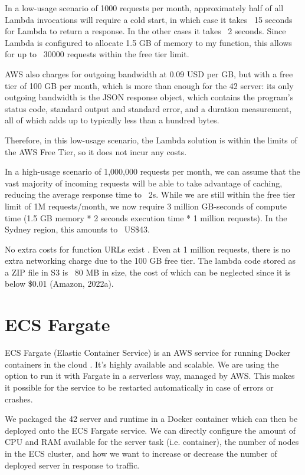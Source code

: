 In a low-usage scenario of 1000 requests per month, approximately half of all Lambda invocations will require a cold start, in which case it takes ~15 seconds for Lambda to return a response. In the other cases it takes ~2 seconds. Since Lambda is configured to allocate 1.5 GB of memory to my function, this allows for up to ~30000 requests within the free tier limit.

AWS also charges for outgoing bandwidth at 0.09 USD per GB, but with a free tier of 100 GB per month, which is more than enough for the 42 server: its only outgoing bandwidth is the JSON response object, which contains the program's status code, standard output and standard error, and a duration measurement, all of which adds up to typically less than a hundred bytes.

Therefore, in this low-usage scenario, the Lambda solution is within the limits of the AWS Free Tier, so it does not incur any costs.

In a high-usage scenario of 1,000,000 requests per month, we can assume that the vast majority of incoming requests will be able to take advantage of caching, reducing the average response time to ~2s. While we are still within the free tier limit of 1M requests/month, we now require 3 million GB-seconds of compute time (1.5 GB memory * 2 seconds execution time * 1 million requests). In the Sydney region, this amounts to ~US\$43.

No extra costs for function URLs exist \cite{casalboni-2022}. Even at 1 million requests, there is no extra networking charge due to the 100 GB free tier. The lambda code stored as a ZIP file in S3 is ~80 MB in size, the cost of which can be neglected since it is below \$0.01 (Amazon, 2022a).

\section{ECS Fargate}

ECS Fargate (Elastic Container Service) is an AWS service for running Docker containers in the cloud \cite{amazon-2022E}. It's highly available and scalable. We are using the option to run it with Fargate in a serverless way, managed by AWS. This makes it possible for the service to be restarted automatically in case of errors or crashes.

We packaged the 42 server and runtime in a Docker container which can then be deployed onto the ECS Fargate service. We can directly configure the amount of CPU and RAM available for the server task (i.e. container), the number of nodes in the ECS cluster, and how we want to increase or decrease the number of deployed server in response to traffic.

